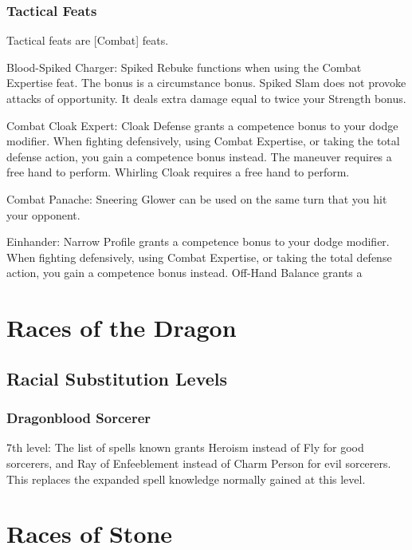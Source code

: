 \subsubsection{Tactical Feats}
Tactical feats are [Combat] feats.
\begin{itemize*}
\item Blood-Spiked Charger: Spiked Rebuke functions when using the Combat Expertise feat. The bonus is a circumstance bonus. Spiked Slam does not provoke attacks of opportunity. It deals extra damage equal to twice your Strength bonus.
\item Combat Cloak Expert: Cloak Defense grants a  competence bonus to your dodge modifier. When fighting defensively, using Combat Expertise, or taking the total defense action, you gain a  competence bonus instead. The maneuver requires a free hand to perform. Whirling Cloak requires a free hand to perform.
\item Combat Panache: Sneering Glower can be used on the same turn that you hit your opponent.
\item Einhander: Narrow Profile grants a  competence bonus to your dodge modifier. When fighting defensively, using Combat Expertise, or taking the total defense action, you gain a  competence bonus instead. Off-Hand Balance grants a 
\end{itemize*}

\section{Races of the Dragon}
\subsection{Racial Substitution Levels}
\subsubsection{Dragonblood Sorcerer}
\begin{itemize*}
\item 7th level: The list of spells known grants Heroism instead of Fly for good sorcerers, and Ray of Enfeeblement instead of Charm Person for evil sorcerers. This replaces the expanded spell knowledge normally gained at this level.
\end{itemize*}

\section{Races of Stone}
